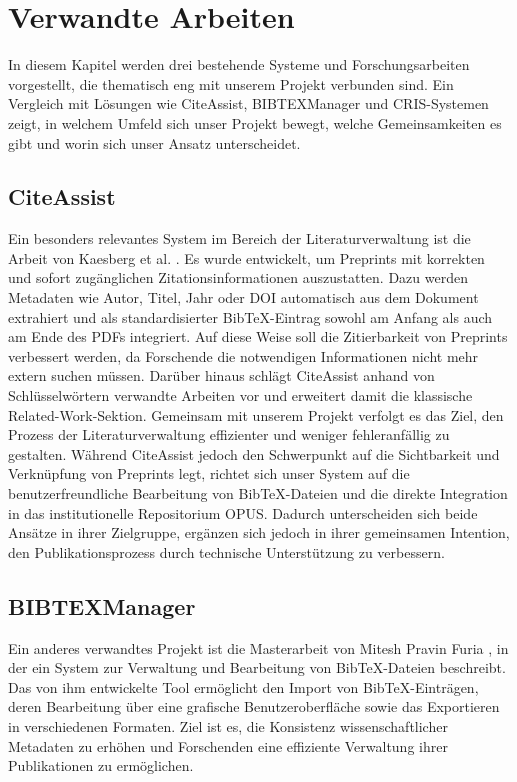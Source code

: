 \chapter{Verwandte Arbeiten}
In diesem Kapitel werden drei bestehende Systeme und Forschungsarbeiten 
vorgestellt, die thematisch eng mit unserem Projekt verbunden sind. 
Ein Vergleich mit Lösungen wie CiteAssist, BIBTEXManager und CRIS-Systemen 
zeigt, in welchem Umfeld sich unser Projekt bewegt, welche Gemeinsamkeiten 
es gibt und worin sich unser Ansatz unterscheidet.

\section{CiteAssist}
Ein besonders relevantes System im Bereich der Literaturverwaltung ist die Arbeit von  
Kaesberg et al. \cite{kaesberg2024citeassist}. 
Es wurde entwickelt, um Preprints mit korrekten und sofort 
zugänglichen Zitationsinformationen auszustatten. Dazu werden 
Metadaten wie Autor, Titel, Jahr oder DOI automatisch aus dem 
Dokument extrahiert und als standardisierter BibTeX-Eintrag 
sowohl am Anfang als auch am Ende des PDFs integriert. Auf 
diese Weise soll die Zitierbarkeit von Preprints verbessert 
werden, da Forschende die notwendigen Informationen nicht 
mehr extern suchen müssen. Darüber hinaus schlägt CiteAssist 
anhand von Schlüsselwörtern verwandte Arbeiten vor und 
erweitert damit die klassische Related-Work-Sektion. 
Gemeinsam mit unserem Projekt verfolgt es das Ziel, 
den Prozess der Literaturverwaltung effizienter und 
weniger fehleranfällig zu gestalten. Während CiteAssist 
jedoch den Schwerpunkt auf die Sichtbarkeit und Verknüpfung 
von Preprints legt, richtet sich unser System auf die 
benutzerfreundliche Bearbeitung von BibTeX-Dateien und 
die direkte Integration in das institutionelle Repositorium 
OPUS. Dadurch unterscheiden sich beide Ansätze in ihrer 
Zielgruppe, ergänzen sich jedoch in ihrer gemeinsamen Intention, 
den Publikationsprozess durch technische Unterstützung zu verbessern.

\section{BIBTEXManager}

Ein anderes  verwandtes Projekt ist die Masterarbeit von Mitesh Pravin Furia \cite{furiabibtex}, in der ein 
System zur Verwaltung und Bearbeitung von Bib\TeX{}-Dateien beschreibt. 
Das von ihm entwickelte Tool ermöglicht den Import von Bib\TeX{}-Einträgen, 
deren Bearbeitung über eine grafische Benutzeroberfläche sowie das Exportieren 
in verschiedenen Formaten. Ziel ist es, die Konsistenz wissenschaftlicher 
Metadaten zu erhöhen und Forschenden eine effiziente Verwaltung ihrer 
Publikationen zu ermöglichen.\\

